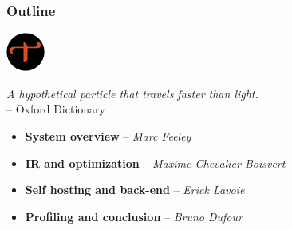 \begin{frame}
\frametitle{\bf Outline}

  \includegraphics[height=0.5in]{images/tachyon-icon.png}
  \begin{minipage}[b]{3.5in}
    \begin{center}
      {\em A hypothetical particle that travels faster than light.} \\
      -- Oxford Dictionary
    \end{center}
  \end{minipage}

  \bigskip

  \begin{itemize}

  \item {\bf System overview} -- {\em Marc Feeley}
    \smallskip

  \item {\bf IR and optimization} -- {\em Maxime Chevalier-Boisvert}
    \smallskip

  \item {\bf Self hosting and back-end} -- {\em Erick Lavoie}
    \smallskip

  \item {\bf Profiling and conclusion} -- {\em Bruno Dufour}
    \smallskip

  \end{itemize}
\end{frame}

